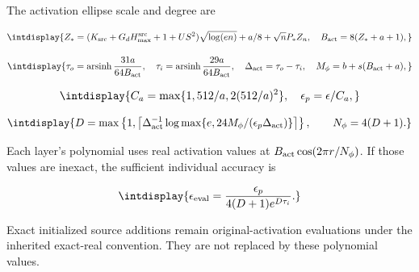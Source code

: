 
The activation ellipse scale and degree are


\begingroup\renewcommand{\theHequation}{intdisplay.273}
\begin{equation*}
\intdisplay{
Z_*=(K_{\rm src}+G_dH_{\max}^{\rm src}+1+US^2)\sqrt{\log(en)}
                                +a/8+\sqrt nP_*Z_n,\quad
B_{\rm act}=8(Z_*+a+1),
}
\end{equation*}
\endgroup

\begingroup\renewcommand{\theHequation}{intdisplay.274}
\begin{equation*}
\intdisplay{
\tau_o=\operatorname{arsinh}\frac{31a}{64B_{\rm act}},\quad
\tau_i=\operatorname{arsinh}\frac{29a}{64B_{\rm act}},\quad
\Delta_{\rm act}=\tau_o-\tau_i,\quad
M_\phi=b+s(B_{\rm act}+a),
}
\end{equation*}
\endgroup

\begingroup\renewcommand{\theHequation}{intdisplay.275}
\begin{equation*}
\intdisplay{
C_a=\max\{1,512/a,2(512/a)^2\},\quad \epsilon_p=\epsilon/C_a,
}
\end{equation*}
\endgroup

\begingroup\renewcommand{\theHequation}{intdisplay.276}
\begin{equation*}
\intdisplay{
D=\max\left\{1,\left\lceil\Delta_{\rm act}^{-1}
\log\max\{e,24M_\phi/(\epsilon_p\Delta_{\rm act})\}\right\rceil\right\},
\qquad N_\phi=4(D+1).
}
\end{equation*}
\endgroup


Each layer's polynomial uses real activation values at \(B_{\rm act}\cos(2\pi r/N_\phi)\). If those values are inexact, the sufficient individual accuracy is


\begingroup\renewcommand{\theHequation}{intdisplay.277}
\begin{equation*}
\intdisplay{
\epsilon_{\rm eval}=
\frac{\epsilon_p}{4(D+1)e^{D\tau_i}}.
}
\end{equation*}
\endgroup


Exact initialized source additions remain original-activation evaluations under the inherited exact-real convention. They are not replaced by these polynomial values.



